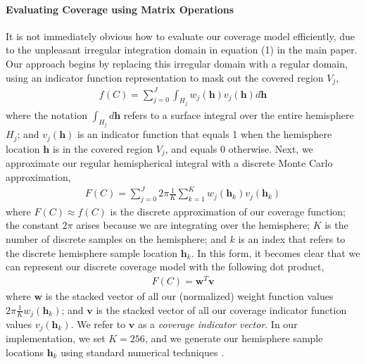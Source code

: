 \paragraph{Evaluating Coverage using Matrix Operations}
It is not immediately obvious how to evaluate our coverage model efficiently, due to the unpleasant irregular integration domain in equation (1) in the main paper.
Our approach begins by replacing this irregular domain with a regular domain, using an indicator function representation to mask out the covered region $V_j$,
%
\begin{equation}
\begin{aligned}
f(C) = \sum_{j=0}^{J} \int_{H_j} w_j(\mathbf{h}) v_{j}(\mathbf{h}) d\mathbf{h}
\end{aligned}
\end{equation}
%
where the notation $\int_{H_j} d\mathbf{h}$ refers to a surface integral over the entire hemisphere $H_j$;
and $v_j(\mathbf{h})$ is an indicator function that equals 1 when the hemisphere location $\mathbf{h}$ is in the covered region $V_j$, and equals 0 otherwise.
Next, we approximate our regular hemispherical integral with a discrete Monte Carlo approximation,
%
\begin{equation}
\begin{aligned}
F(C)= \sum_{j=0}^{J} 2\pi \frac{1}{K} \sum_{k=1}^{K} w_j(\mathbf{h}_k) v_{j}(\mathbf{h}_k)
\end{aligned}
\end{equation}
%
where
$F(C) \approx f(C)$ is the discrete approximation of our coverage function;
the constant $2 \pi$ arises because we are integrating over the hemisphere;
$K$ is the number of discrete samples on the hemisphere;
and $k$ is an index that refers to the discrete hemisphere sample location $\mathbf{h}_k$.
In this form, it becomes clear that we can represent our discrete coverage model with the following dot product,
%
\begin{equation}
\begin{aligned}
F(C) = \mathbf{w}^T \mathbf{v}
\end{aligned}
\end{equation}
%
where $\mathbf{w}$ is the stacked vector of all our (normalized) weight function values $2 \pi \frac{1}{K}w_j(\mathbf{h}_k)$;
and $\mathbf{v}$ is the stacked vector of all our coverage indicator function values $v_j(\mathbf{h}_k)$.
We refer to $\mathbf{v}$ as a \emph{coverage indicator vector}.
In our implementation, we set $K=256$, and we generate our hemisphere sample locations $\mathbf{h}_k$ using standard numerical techniques \cite{devert:2012}.


